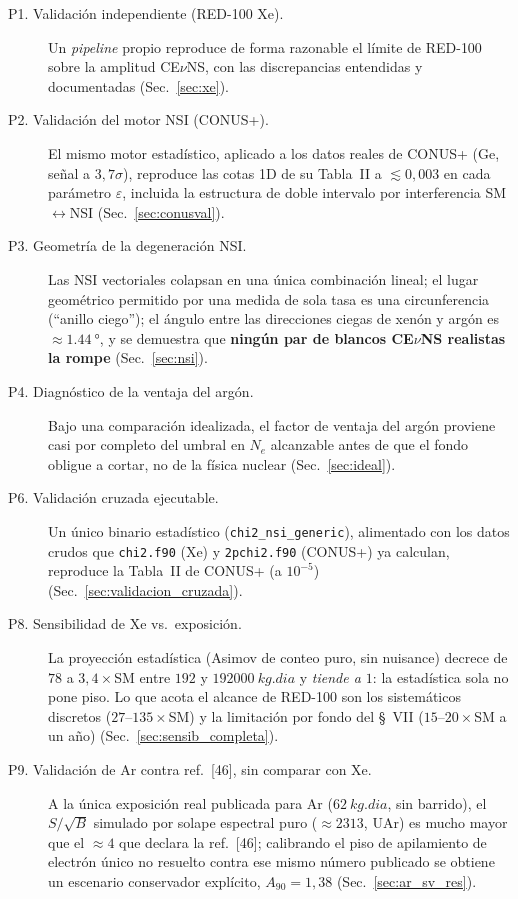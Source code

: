 \documentclass[11pt,a4paper]{article}
\newcommand{\eps}{\varepsilon}
\newcommand{\Ne}{N_{e}}
\newcommand{\code}[1]{\texttt{#1}}
\begin{document}
\begin{description}
  \item[P1. Validaci\'on independiente (RED-100 Xe).] Un \emph{pipeline} propio
    reproduce de forma razonable el l\'imite de RED-100 sobre la amplitud
    CE$\nu$NS, con las discrepancias entendidas y documentadas
    (Sec.~\ref{sec:xe}).
  \item[P2. Validaci\'on del motor NSI (CONUS+).] El mismo motor estad\'istico,
    aplicado a los datos reales de CONUS+ (Ge, se\~nal a $3{,}7\sigma$),
    reproduce las cotas 1D de su Tabla~II a $\lesssim 0{,}003$ en cada
    par\'ametro $\eps$, incluida la estructura de doble intervalo por
    interferencia SM$\leftrightarrow$NSI (Sec.~\ref{sec:conusval}).
  \item[P3. Geometr\'ia de la degeneraci\'on NSI.] Las NSI vectoriales colapsan
    en una \'unica combinaci\'on lineal; el lugar geom\'etrico permitido por una
    medida de sola tasa es una circunferencia (``anillo ciego''); el \'angulo
    entre las direcciones ciegas de xen\'on y arg\'on es $\approx\SI{1.44}{\degree}$,
    y se demuestra que \textbf{ning\'un par de blancos CE$\nu$NS realistas la
    rompe} (Sec.~\ref{sec:nsi}).
  \item[P4. Diagn\'ostico de la ventaja del arg\'on.] Bajo una comparaci\'on
    idealizada, el factor de ventaja del arg\'on proviene casi por completo del
    umbral en $\Ne$ alcanzable antes de que el fondo obligue a cortar, no de la
    f\'isica nuclear (Sec.~\ref{sec:ideal}).
  \item[P6. Validaci\'on cruzada ejecutable.] Un \'unico binario estad\'istico
    (\code{chi2\_nsi\_generic}), alimentado con los datos crudos que
    \code{chi2.f90} (Xe) y \code{2pchi2.f90} (CONUS+) ya calculan, reproduce la
    Tabla~II de CONUS+ (a $10^{-5}$)
    (Sec.~\ref{sec:validacion_cruzada}).
  \item[P8. Sensibilidad de Xe vs.\ exposici\'on.] La proyecci\'on estad\'istica
    (Asimov de conteo puro, sin nuisance) decrece de $78$ a $3{,}4\times$SM entre
    $192$ y $\SI{192000}{kg.dia}$ y \emph{tiende a $1$}: la estad\'istica sola no
    pone piso. Lo que acota el alcance de RED-100 son los sistem\'aticos
    discretos ($27$--$135\times$SM) y la limitaci\'on por fondo del \S~VII
    ($15$--$20\times$SM a un a\~no) (Sec.~\ref{sec:sensib_completa}).
  \item[P9. Validaci\'on de Ar contra ref.\ {[46]}, sin comparar con Xe.] A la
    \'unica exposici\'on real publicada para Ar ($\SI{62}{kg.dia}$, sin
    barrido), el $S/\sqrt{B}$ simulado por solape espectral puro
    ($\approx2313$, UAr) es mucho mayor que el $\approx4$ que declara la ref.\
    {[46]}; calibrando el piso de apilamiento de electr\'on \'unico no resuelto
    contra ese mismo n\'umero publicado se obtiene un escenario conservador
    expl\'icito, $A_{90}=1{,}38$ (Sec.~\ref{sec:ar_sv_res}).
\end{description}
\end{document}
